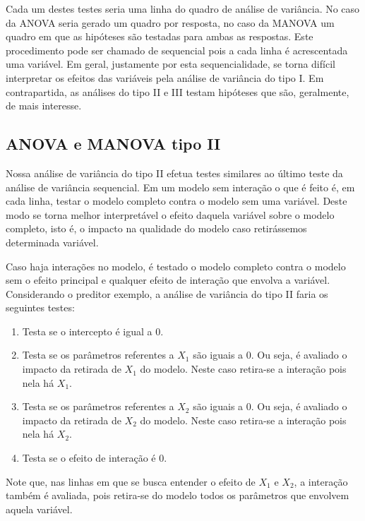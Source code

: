 Cada um destes testes seria uma linha do quadro de análise de variância. No caso da ANOVA seria gerado um quadro por resposta, no caso da MANOVA um quadro em que as hipóteses são testadas para ambas as respostas. Este procedimento pode ser chamado de sequencial pois a cada linha é acrescentada uma variável. Em geral, justamente por esta sequencialidade, se torna difícil interpretar os efeitos das variáveis pela análise de variância do tipo I. Em contrapartida, as análises do tipo II e III testam hipóteses que são, geralmente, de mais interesse.

\subsection{ANOVA e MANOVA tipo II}

Nossa análise de variância do tipo II efetua testes similares ao último teste da análise de variância sequencial. Em um modelo sem interação o que é feito é, em cada linha, testar o modelo completo contra o modelo sem uma variável. Deste modo se torna melhor interpretável o efeito daquela variável sobre o modelo completo, isto é, o impacto na qualidade do modelo caso retirássemos determinada variável.

Caso haja interações no modelo, é testado o modelo completo contra o modelo sem o efeito principal e qualquer efeito de interação que envolva a variável. Considerando o preditor exemplo, a análise de variância do tipo II faria os seguintes testes:

\begin{enumerate}
  \item Testa se o intercepto é igual a 0.
  
  \item Testa se os parâmetros referentes a $X_1$ são iguais a 0. Ou seja, é avaliado o impacto da retirada de $X_1$ do modelo. Neste caso retira-se a interação pois nela há $X_1$.
  
  \item Testa se os parâmetros referentes a $X_2$ são iguais a 0. Ou seja, é avaliado o impacto da retirada de $X_2$ do modelo. Neste caso retira-se a interação pois nela há $X_2$.
  
  \item Testa se o efeito de interação é 0.

\end{enumerate}

Note que, nas linhas em que se busca entender o efeito de $X_1$ e $X_2$, a interação também é avaliada, pois retira-se do modelo todos os parâmetros que envolvem aquela variável.

